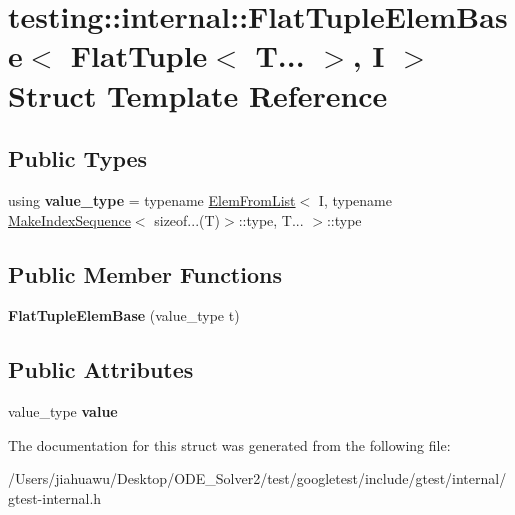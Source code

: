 \hypertarget{structtesting_1_1internal_1_1_flat_tuple_elem_base_3_01_flat_tuple_3_01_t_8_8_8_01_4_00_01_i_01_4}{}\section{testing\+:\+:internal\+:\+:Flat\+Tuple\+Elem\+Base$<$ Flat\+Tuple$<$ T... $>$, I $>$ Struct Template Reference}
\label{structtesting_1_1internal_1_1_flat_tuple_elem_base_3_01_flat_tuple_3_01_t_8_8_8_01_4_00_01_i_01_4}
\subsection*{Public Types}
\begin{DoxyCompactItemize}
\item 
\mbox{\label{structtesting_1_1internal_1_1_flat_tuple_elem_base_3_01_flat_tuple_3_01_t_8_8_8_01_4_00_01_i_01_4_a6b87a445f87724f9363b348e6c697766}} 
using {\bfseries value\+\_\+type} = typename \mbox{\hyperlink{structtesting_1_1internal_1_1_elem_from_list}{Elem\+From\+List}}$<$ I, typename \mbox{\hyperlink{structtesting_1_1internal_1_1_make_index_sequence}{Make\+Index\+Sequence}}$<$ sizeof...(T)$>$\+::type, T... $>$\+::type
\end{DoxyCompactItemize}
\subsection*{Public Member Functions}
\begin{DoxyCompactItemize}
\item 
\mbox{\label{structtesting_1_1internal_1_1_flat_tuple_elem_base_3_01_flat_tuple_3_01_t_8_8_8_01_4_00_01_i_01_4_a153da382b00977dfb5974f85dd31ea58}} 
{\bfseries Flat\+Tuple\+Elem\+Base} (value\+\_\+type t)
\end{DoxyCompactItemize}
\subsection*{Public Attributes}
\begin{DoxyCompactItemize}
\item 
\mbox{\label{structtesting_1_1internal_1_1_flat_tuple_elem_base_3_01_flat_tuple_3_01_t_8_8_8_01_4_00_01_i_01_4_ac175518e7807c0b49c0ba8c1c78269ec}} 
value\+\_\+type {\bfseries value}
\end{DoxyCompactItemize}


The documentation for this struct was generated from the following file\+:\begin{DoxyCompactItemize}
\item 
/\+Users/jiahuawu/\+Desktop/\+O\+D\+E\+\_\+\+Solver2/test/googletest/include/gtest/internal/gtest-\/internal.\+h\end{DoxyCompactItemize}

